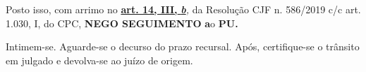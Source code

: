 \documentclass[12pt]{article}
\begin{document}
\noindent Posto isso, com arrimo no \uline{\textbf{art. 14, III, }}\uline{\textit{\textbf{b}}}\textit{,} da Resolução CJF n. 586/2019 c/c art. 1.030, I, do CPC, \textbf{NEGO SEGUIMENTO }\textbf{a}o\textbf{ PU}\textbf{.}

\noindent Intimem-se. Aguarde-se o decurso do prazo recursal. Após, certifique-se o trânsito em julgado e devolva-se ao juízo de origem.
\end{document}

